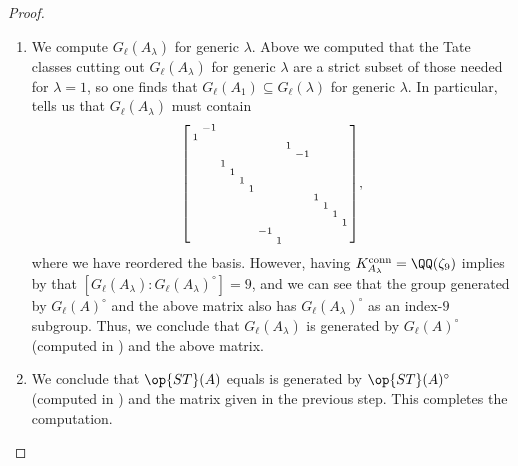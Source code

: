 \documentclass[../thesis.tex]{subfiles}
\begin{document}
\begin{proof}
\begin{enumerate}
		\item We compute $G_\ell(A_\lambda)$ for generic $\lambda$. Above we computed that the Tate classes cutting out $G_\ell(A_\lambda)$ for generic $\lambda$ are a strict subset of those needed for $\lambda=1$, so one finds that $G_\ell(A_1)\subseteq G_\ell(\lambda)$ for generic $\lambda$. In particular,  tells us that $G_\ell(A_\lambda)$ must contain
		\[\begin{bsmallmatrix}
			& -1 \\
			1 \\
			&& &&&&&& 1 \\
			&& &&&&&& & -1 \\
			&& 1 \\
			&& & 1 \\
			&& && 1 \\
			&& && & 1 \\
			&& &&&&&&&& 1 \\
			&& &&&&&&&& & 1 \\
			&& &&&&&&&&&& 1 \\
			&& &&&&&&&&&& & 1 \\
			&& &&&& -1 \\
			&& &&&& & 1
		\end{bsmallmatrix},\]
		where we have reordered the basis. However, having $K_{A_\lambda}^{\mathrm{conn}}=\QQ(\zeta_9)$ implies by  that $[G_\ell(A_\lambda):G_\ell(A_\lambda)^\circ]=9$, and we can see that the group generated by $G_\ell(A)^\circ$ and the above matrix also has $G_\ell(A_\lambda)^\circ$ as an index-$9$ subgroup. Thus, we conclude that $G_\ell(A_\lambda)$ is generated by $G_\ell(A)^\circ$ (computed in ) and the above matrix.

		\item We conclude that $\op{ST}(A)$ equals is generated by $\op{ST}(A)^\circ$ (computed in ) and the matrix given in the previous step. This completes the computation.
		\qedhere
	\end{enumerate}
\end{proof}

\end{document}
